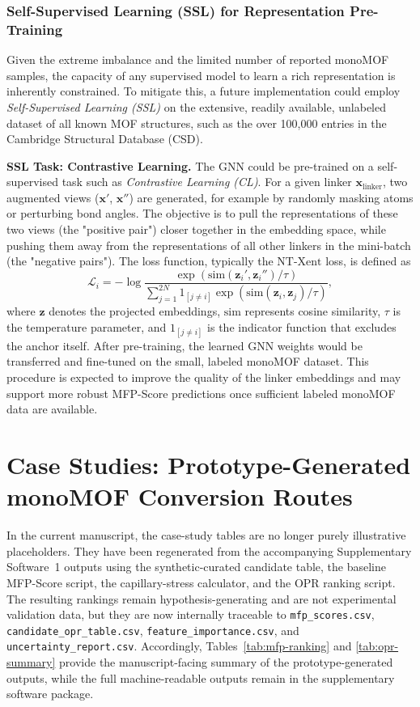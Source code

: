\documentclass[12pt,a4paper]{article}
\begin{document}
\subsubsection{Self-Supervised Learning (SSL) for Representation Pre-Training}

Given the extreme imbalance and the limited number of reported monoMOF samples, the capacity of any supervised model to learn a rich representation is inherently constrained. To mitigate this, a future implementation could employ \textit{Self-Supervised Learning (SSL)} on the extensive, readily available, unlabeled dataset of all known MOF structures, such as the over 100,000 entries in the Cambridge Structural Database (CSD).

\textbf{SSL Task: Contrastive Learning.} 
The GNN could be pre-trained on a self-supervised task such as \textit{Contrastive Learning (CL)}. For a given linker $\mathbf{x}_{\text{linker}}$, two augmented views ($\mathbf{x}'$, $\mathbf{x}''$) are generated, for example by randomly masking atoms or perturbing bond angles. The objective is to pull the representations of these two views (the "positive pair") closer together in the embedding space, while pushing them away from the representations of all other linkers in the mini-batch (the "negative pairs"). The loss function, typically the $\text{NT-Xent}$ loss, is defined as
\[
\mathcal{L}_i = -\log \frac{\exp(\text{sim}(\mathbf{z}_i', \mathbf{z}_i'') / \tau)}
{\sum_{j=1}^{2N} 1_{[j \neq i]} \exp(\text{sim}(\mathbf{z}_i, \mathbf{z}_j) / \tau)},
\]
where $\mathbf{z}$ denotes the projected embeddings, $\text{sim}$ represents cosine similarity, $\tau$ is the temperature parameter, and $1_{[j \neq i]}$ is the indicator function that excludes the anchor itself. After pre-training, the learned GNN weights would be transferred and fine-tuned on the small, labeled monoMOF dataset. This procedure is expected to improve the quality of the linker embeddings and may support more robust MFP-Score predictions once sufficient labeled monoMOF data are available.




\section{Case Studies: Prototype-Generated monoMOF Conversion Routes}

In the current manuscript, the case-study tables are no longer purely illustrative placeholders. They have been regenerated from the accompanying Supplementary Software~1 outputs using the synthetic-curated candidate table, the baseline MFP-Score script, the capillary-stress calculator, and the OPR ranking script. The resulting rankings remain hypothesis-generating and are not experimental validation data, but they are now internally traceable to \texttt{mfp\_scores.csv}, \texttt{candidate\_opr\_table.csv}, \texttt{feature\_importance.csv}, and \texttt{uncertainty\_report.csv}. Accordingly, Tables~\ref{tab:mfp-ranking} and \ref{tab:opr-summary} provide the manuscript-facing summary of the prototype-generated outputs, while the full machine-readable outputs remain in the supplementary software package.
\end{document}
